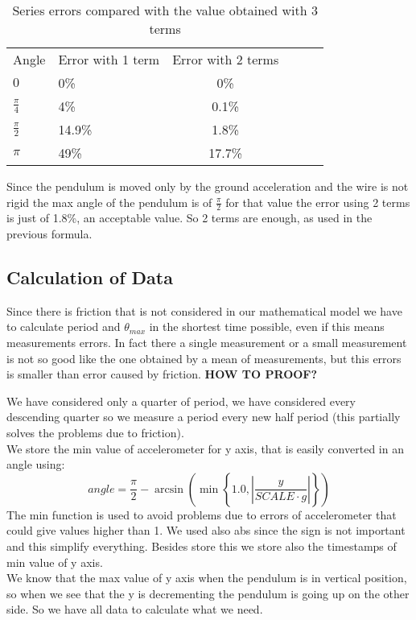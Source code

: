 \begin{table}[H]
	\small
	\begin{center}
		
		\caption{Series errors compared with the value obtained with 3 terms}
		\begin{tabular}{l|lcc|L{2cm}l}
			Angle & Error with 1 term & Error with 2 terms\\
			$0$ & 0\% & 0\%\\			
			$\frac{\pi}{4}$ & 4\% & 0.1\%\\			
			$\frac{\pi}{2}$ & 14.9\% & 1.8\%\\			
			$\pi$ & 49\% & 17.7\%\\			
		\end{tabular}
		\label{tab:errors}
	\end{center}
\end{table}

Since the pendulum is moved only by the ground acceleration and the wire is not rigid the max angle of the pendulum is of $\frac{\pi}{2}$ for that value the error using 2 terms is just of 1.8\%, an acceptable value. So 2 terms are enough, as used in the previous formula.

\subsection{Calculation of Data}
Since there is friction that is not considered in our mathematical model we have to calculate period and $\theta_{max}$ in the shortest time possible, even if this means measurements errors. In fact there a single measurement or a small measurement is not so good like the one obtained by a mean of measurements, but this errors is smaller than error caused by friction. \textbf{HOW TO PROOF?}\par

We have considered only a quarter of period, we have considered every descending quarter so we measure a period every new half period (this partially solves the problems due to friction).\\
We store the min value of accelerometer for y axis, that is easily converted in an angle using:
$$angle = \frac{\pi}{2} -\arcsin\left(\min\left\lbrace1.0, \left|\frac{y}{SCALE \cdot g}\right|\right\rbrace\right)$$
The min function is used to avoid problems due to errors of accelerometer that could give values higher than 1. We used also abs since the sign is not important and this simplify everything.
Besides store this we store also the timestamps of min value of y axis.\\
We know that the max value of y axis when the pendulum is in vertical position, so when we see that the y is decrementing the pendulum is going up on the other side. So we have all data to calculate what we need.\par

